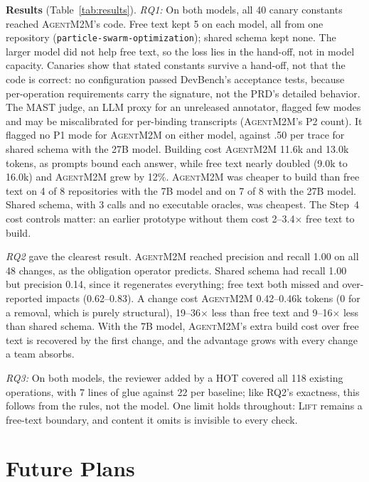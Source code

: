 \documentclass[10pt,conference]{IEEEtran}
\theoremstyle{definition}
\newcommand{\tool}{\textsc{AgentM2M}}
\begin{document}
\smallskip\noindent\textbf{Results} (Table~\ref{tab:results}).
\emph{RQ1:} On both models, all 40 canary constants reached \tool{}'s code.
Free text kept 5 on each model, all from one repository
(\texttt{particle-swarm-optimization}); shared schema kept none. The larger
model did not help free text, so the loss lies in the hand-off, not in model
capacity. Canaries show that
stated constants survive a hand-off, not that the code is correct: no
configuration passed DevBench's acceptance tests, because per-operation
requirements carry the signature, not the PRD's detailed behavior. The MAST
judge, an LLM proxy for an unreleased annotator, flagged few modes and may
be miscalibrated for per-binding transcripts (\tool{}'s P2 count). It
flagged no P1 mode for \tool{} on either model, against .50 per trace for
shared schema with the 27B model. Building cost \tool{} 11.6k and 13.0k tokens, as
prompts bound each answer, while free text nearly doubled (9.0k to 16.0k) and \tool{} grew by 12\%. \tool{} was
cheaper to build than free text on 4 of 8 repositories with the 7B model
and on 7 of 8 with the 27B model. Shared schema, with 3 calls and no
executable oracles, was cheapest. The Step~4 cost controls matter: an
earlier prototype without them cost 2--3.4$\times$ free text to build.

\emph{RQ2} gave the clearest result. \tool{} reached precision and recall
1.00 on all 48 changes, as the obligation operator predicts. Shared schema
had recall 1.00 but precision 0.14, since it regenerates everything; free
text both missed and over-reported impacts (0.62--0.83). A change cost
\tool{} 0.42--0.46k tokens (0 for a removal, which is purely structural),
19--36$\times$ less than free text and 9--16$\times$ less than shared
schema. With the 7B model, \tool{}'s extra build cost over free text is
recovered by the first change, and the advantage grows with every change a
team absorbs.

\emph{RQ3:} On both models, the reviewer added by a HOT covered all 118
existing operations, with 7 lines of glue against 22 per baseline; like
RQ2's exactness, this follows from the rules, not the model. One limit holds throughout: \textsc{Lift}
remains a free-text boundary, and content it omits is invisible to every
check.

\section{Future Plans}\label{sec:future}
\end{document}
